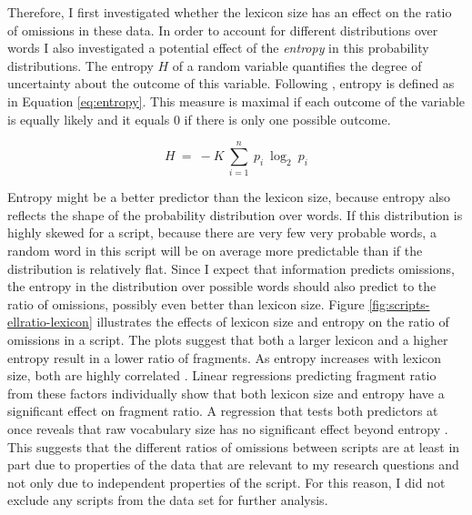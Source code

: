 Therefore, I first investigated whether the lexicon size has an effect on the ratio of omissions in these data. In order to account for different distributions over words I also investigated a potential effect of the \textit{entropy} in this probability distributions. The entropy $H$ of a random variable quantifies the degree of uncertainty about the outcome of this variable. Following \citet[393]{shannon1948}, entropy is defined as in Equation \ref{eq:entropy}. This measure is maximal if each outcome of the variable is equally likely and it equals 0 if there is only one possible outcome.

\begin{equation}
 H\ =\ - K\ \sum_{i=1}^n\ p_i\ \log_2 \ p_i \label{eq:entropy}
\end{equation}

Entropy might be a better predictor than the lexicon size, because entropy also reflects the shape of the probability distribution over words. If this distribution is highly skewed for a script, because there are very few very probable words, a random word in this script will be on average more predictable than if the distribution is relatively flat. Since I expect that information predicts omissions, the entropy in the distribution over possible words should also predict to the ratio of omissions, possibly even better than lexicon size. Figure \ref{fig:scripts-ellratio-lexicon} illustrates the effects of lexicon size and entropy on the ratio of omissions in a script. The plots suggest that both a larger lexicon and a higher entropy result in a lower ratio of fragments. As entropy increases with lexicon size, both are highly correlated . Linear regressions predicting fragment ratio from these factors individually show that both lexicon size  and entropy  have a significant effect on fragment ratio. A regression that tests both predictors at once reveals that raw vocabulary size has no significant effect beyond entropy . This suggests that the different ratios of omissions between scripts are at least in part due to properties of the data that are relevant to my research questions and not only due to independent properties of the script. For this reason, I did not exclude any scripts from the data set for further analysis.

